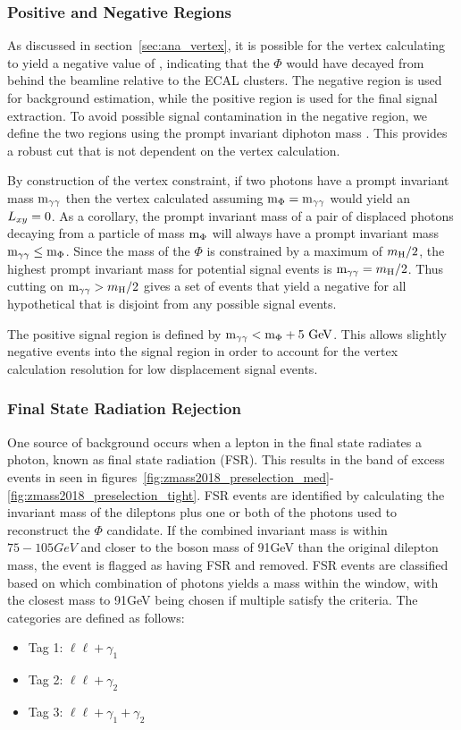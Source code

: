 \subsubsection{Positive and Negative \lxy Regions} \label{sec:ana_lxyregions}
As discussed in section~\ref{sec:ana_vertex}, it is possible for the vertex calculating to yield a negative value of \lxy, indicating that the $\Phi$ would have decayed from behind the beamline relative to the ECAL clusters. The negative \lxy region is used for background estimation, while the positive \lxy region is used for the final signal extraction. To avoid possible signal contamination in the negative \lxy region, we define the two regions using the prompt invariant diphoton mass \mgg. This provides a robust cut that is not dependent on the vertex calculation.

By construction of the vertex constraint, if two photons have a prompt invariant mass $\mgg$ then the vertex calculated assuming $\mphi=\mgg$ would yield an $\lxy=0$. As a corollary, the prompt invariant mass of a pair of displaced photons decaying from a particle of mass $\mphi$ will always have a prompt invariant mass $\mgg\leq\mphi$. Since the mass of the $\Phi$ is constrained by a maximum of $\mh/2$, the highest prompt invariant mass for potential signal events is $\mgg=\mh/2$. Thus cutting on $\mgg>\mh/2$ gives a set of events that yield a negative \lxy for all hypothetical \mphi that is disjoint from any possible signal events.

The positive \lxy signal region is defined by $\mgg<\mphi+5\unit{GeV}$. This allows slightly negative \lxy events into the signal region in order to account for the vertex calculation resolution for low displacement signal events.

\subsubsection{Final State Radiation Rejection} \label{sec:ana_fsr}
One source of background occurs when a lepton in the final state radiates a photon, known as final state radiation (FSR). This results in the band of excess events in \mll seen in figures~\ref{fig:zmass2018_preselection_med}-\ref{fig:zmass2018_preselection_tight}. FSR events are identified by calculating the invariant mass of the dileptons plus one or both of the photons used to reconstruct the $\Phi$ candidate. If the combined invariant mass is within $75-105\unit{GeV}$ and closer to the \VZ boson mass of 91\unit{GeV} than the original dilepton mass, the event is flagged as having FSR and removed. FSR events are classified based on which combination of photons yields a mass within the \VZ window, with the closest mass to 91\unit{GeV} being chosen if multiple satisfy the criteria. The categories are defined as follows:
\begin{itemize}
	\item Tag 1: $\ell\ell+\gamma_1$
	\item Tag 2: $\ell\ell+\gamma_2$
	\item Tag 3: $\ell\ell+\gamma_1+\gamma_2$
\end{itemize}

